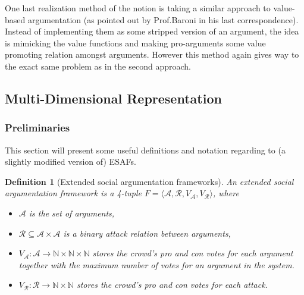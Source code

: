 \documentclass{article}
\newtheorem{definition}{Definition}
\newcommand{\nat}{\mathbb{N}}   %
\newcommand{\args}{\mathcal{A}} %
\newcommand{\att}{\mathcal{R}}  %
\newcommand{\varg}{V_{\args}}   %
\newcommand{\vatt}{V_{\att}}   %
\newcommand{\safid}{F}               %
\newcommand{\saf}{\safid = \safbody} %
\newcommand{\safbody}{\langle \args, \att, \varg, \vatt \rangle} %
\begin{document}
 One last realization method of the notion is taking a similar approach to value-based argumentation (as pointed out by Prof.Baroni in his last correspondence). Instead of implementing them as some stripped version of an argument, the idea is mimicking the value functions and making pro-arguments some value promoting relation amongst arguments.  However this method again gives way to the exact same problem as in the second approach.


\subsection{Multi-Dimensional Representation} 

\subsubsection{Preliminaries}

This section will present some useful definitions and notation regarding to (a slightly modified version of) ESAFs. 
\begin{definition}[Extended social argumentation frameworks]
An \emph{extended social argumentation framework} is a 4-tuple $\saf$, where
\begin{itemize}
  \item $\args$ is the set of arguments,
  \item $\att \subseteq \args \times \args$ is a binary attack relation between arguments,
  \item $\varg : \args \to \nat \times \nat \times \nat$ stores the crowd's pro and con votes for each argument together with the maximum number of votes for an argument in the system.
  \item $\vatt : \att \to \nat \times \nat$ stores the crowd's pro and con votes for each attack.
\end{itemize}
\end{definition}
\end{document}
